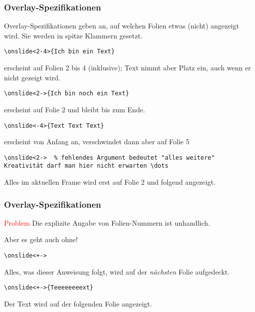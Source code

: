 \begin{slide}
  \frametitle{Overlay-Spezifikationen}
  Overlay-Spezifikationen geben an, auf welchen Folien etwas (nicht) angezeigt wird. Sie werden in spitze Klammern gesetzt.
  \onslide<+->

  \begin{Beispiele}
\begin{lstlisting}
\onslide<2-4>{Ich bin ein Text}
\end{lstlisting}
    erscheint auf Folien 2 bis 4 (inklusive); Text nimmt aber Platz ein, auch wenn er
    nicht gezeigt wird.
    \onslide<+->
\begin{lstlisting}
\onslide<2->{Ich bin noch ein Text}
\end{lstlisting}
    erscheint auf Folie 2 und bleibt bis zum Ende.
    \onslide<+->
\begin{lstlisting}
\onslide<-4>{Text Text Text}
\end{lstlisting}
    erscheint von Anfang an, verschwindet dann aber auf Folie 5
    \onslide<+->
\begin{lstlisting}
\onslide<2->  % fehlendes Argument bedeutet "alles weitere"
Kreativität darf man hier nicht erwarten \dots
\end{lstlisting}
    Alles im aktuellen Frame wird erst auf Folie 2 und folgend angezeigt.
  \end{Beispiele}

\end{slide}

\begin{slide}
  \frametitle{Overlay-Spezifikationen}

  \onslide<+->

  \begin{block}{\textcolor{red}{Problem}}
    Die explizite Angabe von Folien-Nummern ist unhandlich.
  \end{block}

  \onslide<+->

  Aber es geht auch ohne!

  \onslide<+->

  \begin{Beispiele}
\begin{lstlisting}
\onslide<+->
\end{lstlisting}
    Alles, was dieser Anweisung folgt, wird auf der \emph{nächsten} Folie aufgedeckt.
    \onslide<+->
\begin{lstlisting}
\onslide<+->{Teeeeeeeext}
\end{lstlisting}
    Der Text wird auf der folgenden Folie angezeigt.
  \end{Beispiele}

\end{slide}

